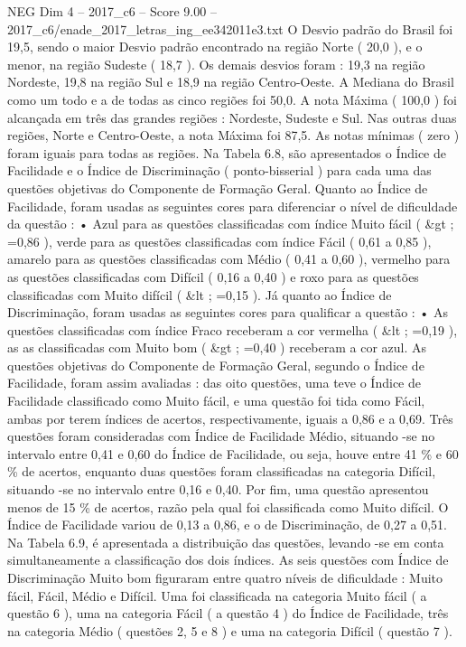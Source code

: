 \begin{textsample}{NEG Dim 4 – 2017\_c6 – Score 9.00 – 2017\_c6/enade\_2017\_letras\_ing\_ee342011e3.txt}
O Desvio padrão do Brasil foi 19,5, sendo o maior Desvio padrão encontrado na região Norte ( 20,0 ), e o menor, na região Sudeste ( 18,7 ).
Os demais desvios foram : 19,3 na região Nordeste, 19,8 na região Sul e 18,9 na região Centro-Oeste.
A Mediana do Brasil como um todo e a de todas as cinco regiões foi 50,0.
A nota Máxima ( 100,0 ) foi alcançada em três das grandes regiões : Nordeste, Sudeste e Sul.
Nas outras duas regiões, Norte e Centro-Oeste, a nota Máxima foi 87,5.
As notas mínimas ( zero ) foram iguais para todas as regiões.
Na Tabela 6.8, são apresentados o Índice de Facilidade e o Índice de Discriminação ( ponto-bisserial ) para cada uma das questões objetivas do Componente de Formação Geral.
Quanto ao Índice de Facilidade, foram usadas as seguintes cores para diferenciar o nível de dificuldade da questão : • Azul para as questões classificadas com índice Muito fácil ( \&gt ; =0,86 ), verde para as questões classificadas com índice Fácil ( 0,61 a 0,85 ), amarelo para as questões classificadas com Médio ( 0,41 a 0,60 ), vermelho para as questões classificadas com Difícil ( 0,16 a 0,40 ) e roxo para as questões classificadas com Muito difícil ( \&lt ; =0,15 ).
Já quanto ao Índice de Discriminação, foram usadas as seguintes cores para qualificar a questão : • As questões classificadas com índice Fraco receberam a cor vermelha ( \&lt ; =0,19 ), as as classificadas com Muito bom ( \&gt ; =0,40 ) receberam a cor azul.
As questões objetivas do Componente de Formação Geral, segundo o Índice de Facilidade, foram assim avaliadas : das oito questões, uma teve o Índice de Facilidade classificado como Muito fácil, e uma questão foi tida como Fácil, ambas por terem índices de acertos, respectivamente, iguais a 0,86 e a 0,69.
Três questões foram consideradas com Índice de Facilidade Médio, situando -se no intervalo entre 0,41 e 0,60 do Índice de Facilidade, ou seja, houve entre 41 \% e 60 \% de acertos, enquanto duas questões foram classificadas na categoria Difícil, situando -se no intervalo entre 0,16 e 0,40.
Por fim, uma questão apresentou menos de 15 \% de acertos, razão pela qual foi classificada como Muito difícil.
O Índice de Facilidade variou de 0,13 a 0,86, e o de Discriminação, de 0,27 a 0,51.
Na Tabela 6.9, é apresentada a distribuição das questões, levando -se em conta simultaneamente a classificação dos dois índices.
As seis questões com Índice de Discriminação Muito bom figuraram entre quatro níveis de dificuldade : Muito fácil, Fácil, Médio e Difícil.
Uma foi classificada na categoria Muito fácil ( a questão 6 ), uma na categoria Fácil ( a questão 4 ) do Índice de Facilidade, três na categoria Médio ( questões 2, 5 e 8 ) e uma na categoria Difícil ( questão 7 ).

\end{textsample}
